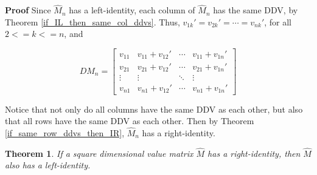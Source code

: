 \documentclass[10pt,letterpaper]{article}
\newtheorem{thm}{Theorem}[section]
\newenvironment{proof}{\noindent\textbf{Proof} }{\qed \newline}
\newcommand{\qed}{\nobreak \ifvmode \relax \else
      \ifdim\lastskip<1.5em \hskip-\lastskip
      \hskip1.5em plus0em minus0.5em \fi \nobreak
      \vrule height0.75em width0.5em depth0.25em\fi}
\numberwithin{equation}{section}
\begin{document}
\begin{proof}
Since $\hat M_n$ has a left-identity, each column of $\hat M_n$ has
the same DDV, by Theorem \ref{if_IL_then_same_col_ddvs}.  Thus,
$v_{1k} \prime = v_{2k} \prime = \cdots = v_{nk} \prime$, for all $2 <= k <=
n$, and

\[ DM_n = \left[ \begin{matrix} 
  v_{11} & v_{11} + v_{12} \prime & \cdots & v_{11} + v_{1n} \prime \\
  v_{21} & v_{21} + v_{12} \prime & \cdots & v_{21} + v_{1n} \prime \\
  \vdots & \vdots & \ddots & \vdots \\
  v_{n1} & v_{n1} + v_{12} \prime & \cdots & v_{n1} + v_{1n} \prime
 \end{matrix} \right] \]

Notice that not only do all columns have the same DDV as each other,
but also that all rows have the same DDV as each other.  Then by Theorem
\ref{if_same_row_ddvs_then_IR}, $\hat M_n$ has a right-identity.\end{proof}

\begin{thm}If a square dimensional value matrix $\hat M$  has a
  right-identity, then $\hat M$ also has a left-identity.\end{thm}
\end{document}
